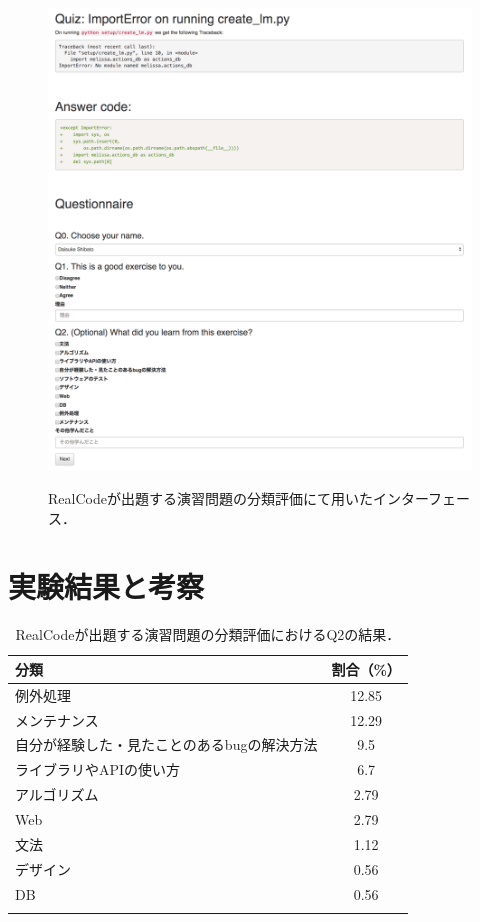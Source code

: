 \begin{figure}[H]
　\centering
  \includegraphics[width=1.0\columnwidth]{20181218-lab-study-interface-all.png}
  \caption{RealCodeが出題する演習問題の分類評価にて用いたインターフェース．}
  \label{fig:lab-study}
\end{figure}

\section{実験結果と考察}

\begin{table}[b]
  \centering
  \caption{RealCodeが出題する演習問題の分類評価におけるQ2の結果．}
  \label{table:lab-study-q2-result}
  \begin{tabular}{ l | c } \Xhline{3\arrayrulewidth}
      分類 & 割合（\%） \\ \hline \hline
      例外処理 & 12.85 \\
      メンテナンス & 12.29  \\
      自分が経験した・見たことのあるbugの解決方法 & 9.5 \\
      ライブラリやAPIの使い方 & 6.7 \\
      アルゴリズム & 2.79 \\
      Web & 2.79 \\
      文法 & 1.12 \\  
      デザイン & 0.56 \\
      DB & 0.56 \\
      \Xhline{3\arrayrulewidth}
  \end{tabular}
\end{table}

